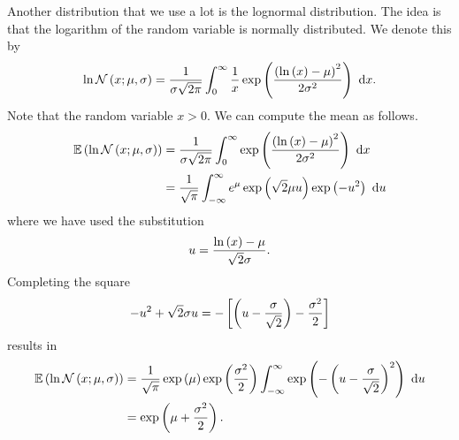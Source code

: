 Another distribution that we use a lot is the lognormal distribution.  The idea is that the logarithm of the random variable is normally distributed.  We denote this by
\begin{align*}
  \ln\mathcal{N}\left(x; \mu, \sigma\right) = \frac{1}{\sigma\sqrt{2\pi}}\int_{0}^{\infty}{\frac{1}{x}\exp\left(\frac{\left(\ln\left(x\right) - \mu\right)^{2}}{2\sigma^{2}}\right) \ \mathrm{d}x}.
\end{align*}
Note that the random variable $x > 0$.  We can compute the mean as follows.
\begin{align*}
  \mathbb{E}\left(\ln\mathcal{N}\left(x; \mu, \sigma\right)\right) &= \frac{1}{\sigma\sqrt{2\pi}}\int_{0}^{\infty}{\exp\left(\frac{\left(\ln\left(x\right) - \mu\right)^{2}}{2\sigma^{2}}\right)\ \mathrm{d}x} \\
     &= \frac{1}{\sqrt{\pi}}\int_{-\infty}^{\infty}{e^{\mu}\exp\left(\sqrt{2}\mu u\right)\exp\left(-u^{2}\right) \ \mathrm{d}u}
\end{align*}
where we have used the substitution
\begin{align*}
  u = \frac{\ln\left(x\right) - \mu}{\sqrt{2}\sigma}.
\end{align*}
Completing the square
\begin{align*}
  -u^{2} + \sqrt{2}\sigma u = -\left[\left(u - \dfrac{\sigma}{\sqrt{2}}\right) - \dfrac{\sigma^{2}}{2}\right]
\end{align*}
results in
\begin{align*}
  \mathbb{E}\left(\ln\mathcal{N}\left(x; \mu, \sigma\right)\right) &= \frac{1}{\sqrt{\pi}}\exp\left(\mu\right)\exp\left(\frac{\sigma^{2}}{2}\right)\int_{-\infty}^{\infty}{\exp\left(-\left(u - \frac{\sigma}{\sqrt{2}}\right)^{2}\right)\ \mathrm{d}u} \\
  &= \exp\left(\mu + \frac{\sigma^{2}}{2}\right).
\end{align*}





























